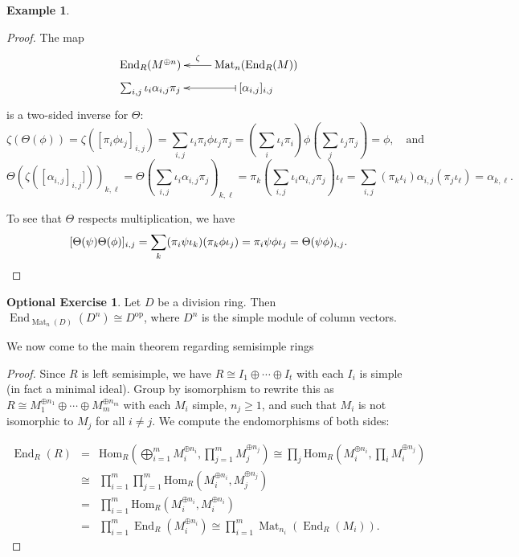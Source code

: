 \documentclass{amsart}[12pt]
\def\End{\operatorname{End}}
\def\Mat{\operatorname{Mat}}
\newcommand{\Hom}{\mathrm{Hom}}
\newcommand{\op}{\mathrm{op}}
\numberwithin{equation}{section}
\theoremstyle{plain} %
\theoremstyle{definition}
\newtheorem{ex}[equation]{Example}
\newtheorem{exer}[equation]{Optional Exercise}
\theoremstyle{remark}
\begin{document}
\begin{ex}
\begin{proof}
The map
\[ \xymatrix@R=1mm{ \End_R(M^{\oplus n}) &\ar[l]_-{\zeta}  \Mat_n(\End_R(M)) \\
\sum_{i,j} \iota_i  \alpha_{i,j}  \pi_j & \ar@{|->}[l]  [\alpha_{i,j}]_{i,j} }\]
is a two-sided inverse for $\Theta$:
\[ \zeta (\Theta(\phi)) = \zeta ( [\pi_i  \phi  \iota_j]_{i,j} ) = \sum_{i,j} \iota_i \pi_i  \phi  \iota_j \pi_j =(\sum_i \iota_i \pi_i) \phi (\sum_j \iota_j \pi_j)=\phi, \quad\text{and}\]
\[ \Theta(\zeta([\alpha_{i,j}]_{i,j}]))_{k,\ell} = \Theta ( \sum_{i,j} \iota_i  \alpha_{i,j}  \pi_j)_{k,\ell} = \pi_k (\sum_{i,j} \iota_i  \alpha_{i,j}  \pi_j) \iota_\ell = \sum_{i,j}  (\pi_k \iota_i) \alpha_{i,j} (\pi_j \iota_\ell) = \alpha_{k,\ell}. \]



To see that $\Theta$ respects multiplication, we have 
\[ [\Theta (\psi) \Theta(\phi) ]_{i,j}= \sum_k (\pi_i  \psi  \iota_k) (\pi_k  \phi  \iota_j) = \pi_i  \psi\phi  \iota_j = \Theta(\psi \phi)_{i,j}.\qedhere\]
\end{proof}

\begin{exer} Let $D$ be a division ring. Then $\End_{\Mat_n(D)}(D^n)\cong D^{\op}$, where $D^n$ is the simple module of column vectors.
\end{exer}


We now come to the main theorem regarding semisimple rings

\begin{proof}
  Since $R$ is left semisimple, we have $R \cong I_1 \oplus \cdots \oplus I_t$ with each $I_i$ is simple (in fact a minimal ideal). Group by isomorphism to rewrite this as $R \cong M_1^{\oplus n_1} \oplus \cdots \oplus M_m^{\oplus n_m}$ with each $M_i$ simple, $n_j \geq 1$, 
  and such that $M_i$ is not isomorphic to $M_j$ for all $i \ne j$. We compute the endomorphisms of both sides:
  
  \begin{eqnarray*} \label{E912}
  \End_R(R) &=& \Hom_R(\bigoplus_{i=1}^m M_i^{\oplus n_i}, \prod_{j=1}^m M_j^{\oplus n_j}) \cong  \prod_j \Hom_R(M_i^{\oplus n_i}, \prod_i  M_i^{\oplus n_j})\\
  &\cong&  \prod_{i=1}^m \prod_{j=1}^m \Hom_R(M_i^{\oplus n_i}, M_j^{\oplus n_j}) \\
  &=& \prod_{i=1}^m \Hom_R(M_i^{\oplus n_i}, M_i^{\oplus n_i}) \\
  &=& \prod_{i=1}^m  \End_R(M_i^{\oplus n_i})\cong \prod_{i=1}^m  \Mat_{n_i}(\End_R(M_i)).
\end{eqnarray*}


\end{proof}
\end{ex}
\end{document}
